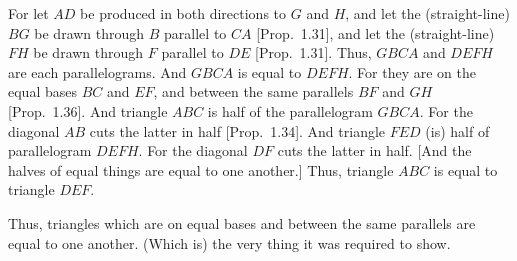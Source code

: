 \begin{Parallel}{}{}
{\epsfysize=1.5in
\centerline{}

For let $AD$ be produced in both directions to $G$ and $H$, and
let the (straight-line) $BG$ be drawn through $B$ parallel to $CA$ [Prop.~1.31], and let the (straight-line) $FH$ be drawn through
$F$ parallel to $DE$ [Prop.~1.31]. Thus,  $GBCA$ and $DEFH$ are
each parallelograms. And $GBCA$ is equal to $DEFH$.
For they are on the equal bases $BC$ and $EF$, and between  the same
parallels $BF$ and $GH$ [Prop.~1.36]. And triangle $ABC$ is half of the parallelogram
$GBCA$. For the diagonal $AB$ cuts the latter in half [Prop.~1.34]. And
triangle $FED$ (is) half of parallelogram $DEFH$. For the diagonal $DF$ cuts
the latter in half. [And the halves of equal things are equal to one another.] Thus,
triangle $ABC$ is equal to triangle $DEF$.

Thus, triangles which are on equal bases and between the same parallels
are equal to one another. (Which is) the very thing it was required to show.}
\end{Parallel}

